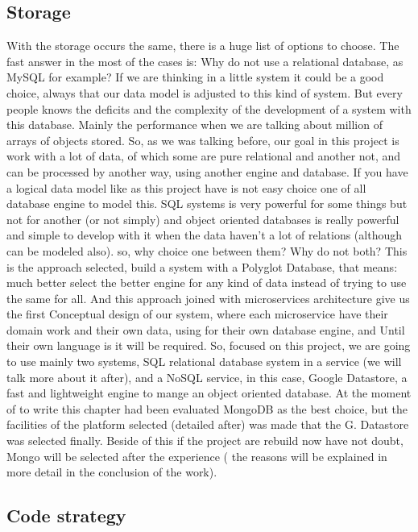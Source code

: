 \subsection{Storage}

With the storage occurs the same, there is a huge list of options to
choose. The fast answer in the most of the cases is: Why do not use a relational
database, as MySQL for example? If we are thinking in a little system
it could be a good choice, always that our data model is adjusted to this kind of system.
But every people knows the deficits and the complexity of the development of a system
with this database. Mainly the performance when we are talking about million
of arrays of objects stored. So, as we was talking before, our goal in this project
is work with a lot of data, of which some are pure relational and another not,
and can be processed by another way, using another engine and database.
\intro
If you have a logical data model like as this project have is not easy choice one
of all database engine to model this. SQL systems is very powerful for some
things but not for another (or not simply) and object oriented databases is
really powerful and simple to develop with it when the data haven't a lot of
relations (although can be modeled also).
so, why choice one between them? Why do not both? This is the approach selected,
build a system with a Polyglot Database, that means: much better select the better
engine for any kind of data instead of trying to use the same for all.
\intro
And this approach joined with microservices architecture give us the first
Conceptual design of our system, where each microservice have their domain work and their
own data, using for their own database engine, and
Until their own language is it will be required.
\intro
So, focused on this project, we are going to use mainly two systems, SQL
relational database system in a service (we will talk more about it after),
and a NoSQL service, in this case, Google Datastore, a fast and lightweight
engine to mange an object oriented database.
\intro
At the moment of to write this chapter had been evaluated MongoDB as the best
choice, but the facilities of the platform selected (detailed after) was made
that the G. Datastore was selected finally. Beside of this if the project are
rebuild now have not doubt, Mongo will be selected after the experience ( the
reasons will be explained in more detail in the conclusion of the work).

\subsection{Code strategy}

